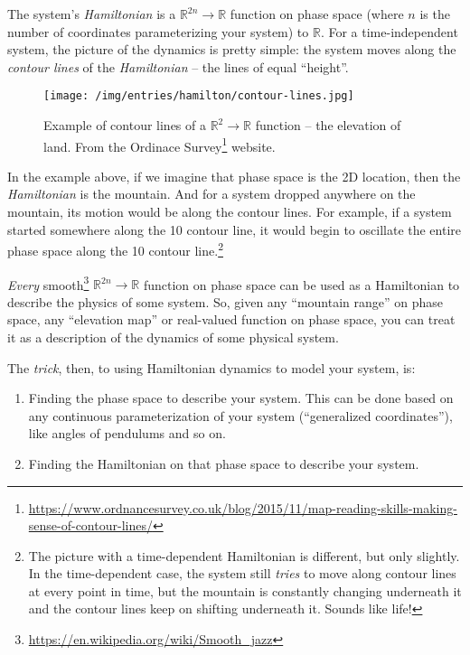 \documentclass[]{article}
\renewcommand{\href}[2]{#2\footnote{\url{#1}}}
\begin{document}
The system's \emph{Hamiltonian} is a \(\mathbb{R}^{2n} \rightarrow \mathbb{R}\)
function on phase space (where \(n\) is the number of coordinates parameterizing
your system) to \(\mathbb{R}\). For a time-independent system, the picture of
the dynamics is pretty simple: the system moves along the \emph{contour lines}
of the \emph{Hamiltonian} -- the lines of equal ``height''.

\begin{figure}[htbp]
\centering
\texttt{[image: /img/entries/hamilton/contour-lines.jpg]}
\caption{Example of contour lines of a \(\mathbb{R}^2 \rightarrow \mathbb{R}\)
function -- the elevation of land. From the
\href{https://www.ordnancesurvey.co.uk/blog/2015/11/map-reading-skills-making-sense-of-contour-lines/}{Ordinace
Survey} website.}
\end{figure}

In the example above, if we imagine that phase space is the 2D location, then
the \emph{Hamiltonian} is the mountain. And for a system dropped anywhere on the
mountain, its motion would be along the contour lines. For example, if a system
started somewhere along the 10 contour line, it would begin to oscillate the
entire phase space along the 10 contour line.\footnote{The picture with a
  time-dependent Hamiltonian is different, but only slightly. In the
  time-dependent case, the system still \emph{tries} to move along contour lines
  at every point in time, but the mountain is constantly changing underneath it
  and the contour lines keep on shifting underneath it. Sounds like life!}

\emph{Every} \href{https://en.wikipedia.org/wiki/Smooth_jazz}{smooth}
\(\mathbb{R}^{2n} \rightarrow \mathbb{R}\) function on phase space can be used
as a Hamiltonian to describe the physics of some system. So, given any
``mountain range'' on phase space, any ``elevation map'' or real-valued function
on phase space, you can treat it as a description of the dynamics of some
physical system.

The \emph{trick}, then, to using Hamiltonian dynamics to model your system, is:

\begin{enumerate}
\def\labelenumi{\arabic{enumi}.}
\item
  Finding the phase space to describe your system. This can be done based on any
  continuous parameterization of your system (``generalized coordinates''), like
  angles of pendulums and so on.
\item
  Finding the Hamiltonian on that phase space to describe your system.
\end{enumerate}
\end{document}
